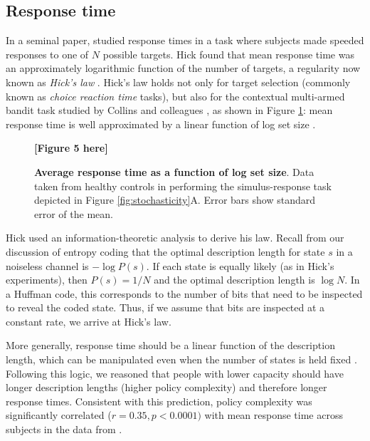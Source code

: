 \documentclass[11pt]{article}
\begin{document}
\subsection{Response time}

In a seminal paper, \citet{hick52} studied response times in a task where subjects made speeded responses to one of $N$ possible targets. Hick found that mean response time was an approximately logarithmic function of the number of targets, a regularity now known as \emph{Hick's law} \citep[see][for a recent review]{proctor18}. Hick's law holds not only for target selection (commonly known as \emph{choice reaction time} tasks), but also for the contextual multi-armed bandit task studied by Collins and colleagues \citep{collins12,collins14,collins18}, as shown in Figure \ref{fig:RT}: mean response time is well approximated by a linear function of log set size \citep[see also][for more detailed analyses of response times in this task]{mcdougle20}.

\begin{figure}
    \centering
    \textbf{[Figure 5 here]}
    \caption{\textbf{Average response time as a function of log set size}. Data taken from healthy controls in \citet{collins14} performing the simulus-response task depicted in Figure \ref{fig:stochasticity}A. Error bars show standard error of the mean.}
    \label{fig:RT}
\end{figure}

Hick used an information-theoretic analysis to derive his law. Recall from our discussion of entropy coding that the optimal description length for state $s$ in a noiseless channel is $-\log P(s)$. If each state is equally likely (as in Hick's experiments), then $P(s) = 1/N$ and the optimal description length is $\log N$. In a Huffman code, this corresponds to the number of bits that need to be inspected to reveal the coded state. Thus, if we assume that bits are inspected at a constant rate, we arrive at Hick's law.

More generally, response time should be a linear function of the description length, which can be manipulated even when the number of states is held fixed \citep{hyman53}. Following this logic, we reasoned that people with lower capacity should have longer description lengths (higher policy complexity) and therefore longer response times. Consistent with this prediction, policy complexity was significantly correlated ($r = 0.35, p < 0.0001)$ with mean response time across subjects in the data from \citet{collins18}.
\end{document}
